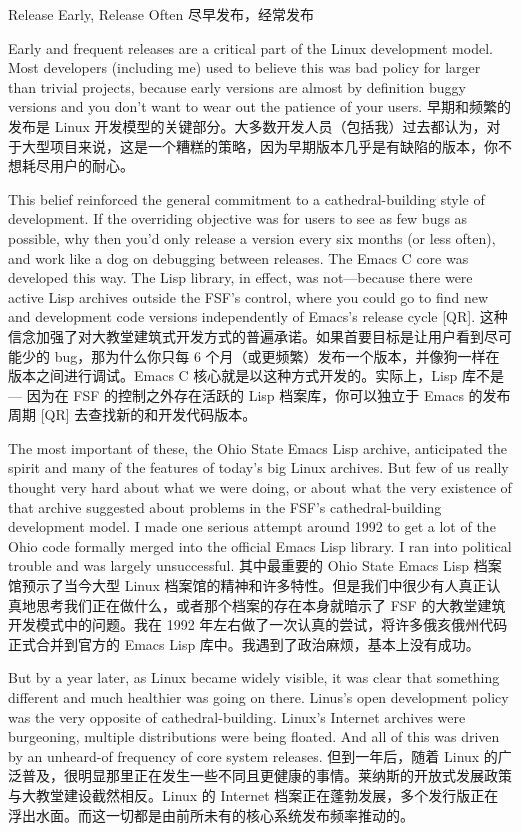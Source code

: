 \documentclass[a4paper,12pt,UTF8,twoside]{ctexbook}
\begin{document}
 Release Early, Release Often
尽早发布，经常发布

Early and frequent releases are a critical part of the Linux development model. Most developers (including me) used to believe this was bad policy for larger than trivial projects, because early versions are almost by definition buggy versions and you don't want to wear out the patience of your users.
早期和频繁的发布是 Linux 开发模型的关键部分。大多数开发人员（包括我）过去都认为，对于大型项目来说，这是一个糟糕的策略，因为早期版本几乎是有缺陷的版本，你不想耗尽用户的耐心。

This belief reinforced the general commitment to a cathedral-building style of development. If the overriding objective was for users to see as few bugs as possible, why then you'd only release a version every six months (or less often), and work like a dog on debugging between releases. The Emacs C core was developed this way. The Lisp library, in effect, was not—because there were active Lisp archives outside the FSF's control, where you could go to find new and development code versions independently of Emacs's release cycle [QR].
这种信念加强了对大教堂建筑式开发方式的普遍承诺。如果首要目标是让用户看到尽可能少的 bug，那为什么你只每 6 个月（或更频繁）发布一个版本，并像狗一样在版本之间进行调试。Emacs C 核心就是以这种方式开发的。实际上，Lisp 库不是 — 因为在 FSF 的控制之外存在活跃的 Lisp 档案库，你可以独立于 Emacs 的发布周期 [QR] 去查找新的和开发代码版本。

The most important of these, the Ohio State Emacs Lisp archive, anticipated the spirit and many of the features of today's big Linux archives. But few of us really thought very hard about what we were doing, or about what the very existence of that archive suggested about problems in the FSF's cathedral-building development model. I made one serious attempt around 1992 to get a lot of the Ohio code formally merged into the official Emacs Lisp library. I ran into political trouble and was largely unsuccessful.
其中最重要的 Ohio State Emacs Lisp 档案馆预示了当今大型 Linux 档案馆的精神和许多特性。但是我们中很少有人真正认真地思考我们正在做什么，或者那个档案的存在本身就暗示了 FSF 的大教堂建筑开发模式中的问题。我在 1992 年左右做了一次认真的尝试，将许多俄亥俄州代码正式合并到官方的 Emacs Lisp 库中。我遇到了政治麻烦，基本上没有成功。

But by a year later, as Linux became widely visible, it was clear that something different and much healthier was going on there. Linus's open development policy was the very opposite of cathedral-building. Linux's Internet archives were burgeoning, multiple distributions were being floated. And all of this was driven by an unheard-of frequency of core system releases.
但到一年后，随着 Linux 的广泛普及，很明显那里正在发生一些不同且更健康的事情。莱纳斯的开放式发展政策与大教堂建设截然相反。Linux 的 Internet 档案正在蓬勃发展，多个发行版正在浮出水面。而这一切都是由前所未有的核心系统发布频率推动的。
\end{document}
